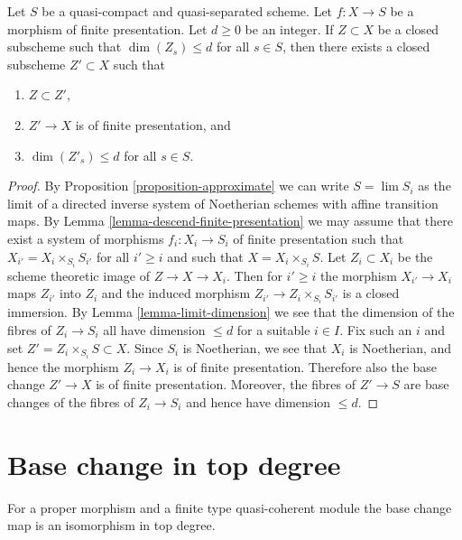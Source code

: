 \begin{lemma}
\label{lemma-approximate-given-relative-dimension}
Let $S$ be a quasi-compact and quasi-separated scheme.
Let $f : X \to S$ be a morphism of finite presentation.
Let $d \geq 0$ be an integer.
If $Z \subset X$ be a closed subscheme such that
$\dim(Z_s) \leq d$ for all $s \in S$, then there exists a
closed subscheme $Z' \subset X$ such that
\begin{enumerate}
\item $Z \subset Z'$,
\item $Z' \to X$ is of finite presentation, and
\item $\dim(Z'_s) \leq d$ for all $s \in S$.
\end{enumerate}
\end{lemma}

\begin{proof}
By
Proposition \ref{proposition-approximate}
we can write $S = \lim S_i$ as the limit of a directed inverse
system of Noetherian schemes with affine transition maps. By
Lemma \ref{lemma-descend-finite-presentation}
we may assume that there exist a system of morphisms
$f_i : X_i \to S_i$ of finite presentation such that
$X_{i'} = X_i \times_{S_i} S_{i'}$
for all $i' \geq i$ and such that $X = X_i \times_{S_i} S$.
Let $Z_i \subset X_i$ be the scheme theoretic image of
$Z \to X \to X_i$. Then for $i' \geq i$ the morphism $X_{i'} \to X_i$
maps $Z_{i'}$ into $Z_i$ and the induced morphism
$Z_{i'} \to Z_i \times_{S_i} S_{i'}$ is a closed immersion. By
Lemma \ref{lemma-limit-dimension}
we see that the dimension of the fibres of $Z_i \to S_i$
all have dimension $\leq d$ for a suitable $i \in I$.
Fix such an $i$ and set $Z' = Z_i \times_{S_i} S \subset X$.
Since $S_i$ is Noetherian, we see that $X_i$ is Noetherian, and hence
the morphism $Z_i \to X_i$ is of finite presentation.
Therefore also the base change $Z' \to X$ is of finite presentation.
Moreover, the fibres of $Z' \to S$ are base changes of the fibres
of $Z_i \to S_i$ and hence have dimension $\leq d$.
\end{proof}






\section{Base change in top degree}
\label{section-top-degree}

\noindent
For a proper morphism and a finite type quasi-coherent module
the base change map is an isomorphism in top degree.

